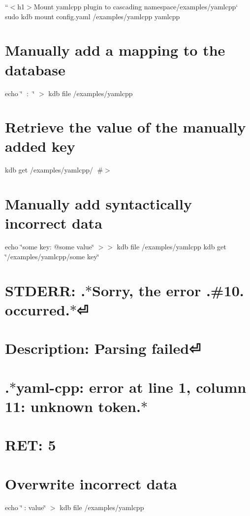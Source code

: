 ``{\ttfamily  $<$h1$>$Mount yamlcpp plugin to cascading namespace}/examples/yamlcpp` sudo kdb mount config.\+yaml /examples/yamlcpp yamlcpp

\section*{Manually add a mapping to the database}

echo \char`\"{}🔑 \+: 🐳\char`\"{} $>$ {\ttfamily kdb file /examples/yamlcpp} \section*{Retrieve the value of the manually added key}

kdb get /examples/yamlcpp/🔑 \#$>$ 🐳

\section*{Manually add syntactically incorrect data}

echo \char`\"{}some key\+: @some  value\char`\"{} $>$$>$ {\ttfamily kdb file /examples/yamlcpp} kdb get \char`\"{}/examples/yamlcpp/some key\char`\"{} \section*{S\+T\+D\+E\+RR\+: .$\ast$\+Sorry, the error .\#10. occurred.$\ast$⏎}

\section*{Description\+: Parsing failed⏎}

\section*{.$\ast$yaml-\/cpp\+: error at line 1, column 11\+: unknown token.$\ast$}

\section*{R\+ET\+: 5}

\section*{Overwrite incorrect data}

echo \char`\"{}🔑\+: value\char`\"{} $>$ {\ttfamily kdb file /examples/yamlcpp}

